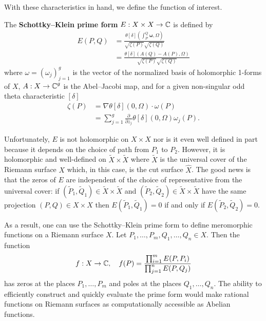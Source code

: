 With these characteristics in hand, we define the function of interest.
\begin{definition}
  The {\bf Schottky--Klein prime form} $E: X \times X \to \operatorname{\mathbb{C}}$ is defined
  by
  \begin{align*}
    E(P,Q)
    &=
    \frac{
      \theta[\delta]
      \left( \int_{P}^{Q}\mathbf{\omega},\Omega \right)
    }
    {
      \sqrt{\zeta(P)}\sqrt{\zeta(Q)}
    } \\
    &=
    \frac{
      \theta[\delta]
      \left( A(Q) - A(P), \Omega \right)
    }
    {
      \sqrt{\zeta(P)}\sqrt{\zeta(Q)}
    }
  \end{align*}
  where $\omega = (\omega_j)_{j=1}^g$ is the vector of the normalized
  basis of holomorphic 1-forms of $X$, $A: X \to \operatorname{\mathbb{C}}^g$ is the
  Abel--Jacobi map, and for a given non-singular odd theta
  characteristic $[\delta]$
  \begin{align*}
    \zeta(P)
    &= \nabla \theta[\delta](0,\Omega) \cdot \omega(P) \\
    &= \sum_{j=1}^g \frac{\partial}{\partial z_j}
    \theta[\delta](0,\Omega) \omega_j(P).
  \end{align*}
\end{definition}

Unfortunately, $E$ is not holomorphic on $X \times X$ nor is it even
well defined in part because it depends on the choice of path from $P_1$
to $P_2$. However, it is holomorphic and well-defined on $\tilde{X}
\times \tilde{X}$ where $\tilde{X}$ is the universal cover of the
Riemann surface $X$ which, in this case, is the cut surface
$\hat{X}$. The good news is that the zeros of $E$ are independent of the
choice of representative from the universal cover: if
$(\tilde{P}_1,\tilde{Q}_1) \in \tilde{X} \times \tilde{X}$ and
$(\tilde{P}_2,\tilde{Q}_2) \in \tilde{X} \times \tilde{X}$ have the same
projection $(P,Q) \in X \times X$ then $E(\tilde{P}_1,\tilde{Q}_1) = 0$
if and only if $E(\tilde{P}_2,\tilde{Q}_2) = 0$.

As a result, one can use the Schottky--Klein prime form to define
meromorphic functions on a Riemann surface $X$. Let
$P_1,\ldots,P_m,Q_1,\ldots,Q_n \in X$. Then the function
\[
    f : X \to \operatorname{\mathbb{C}}, \quad
    f(P) = \frac{\prod_{i=1}^m E(P,P_i)}{\prod_{j=1}^n E(P,Q_j)}
\]
has zeros at the places $P_1,\ldots,P_m$ and poles at the places
$Q_1,\ldots,Q_n$. The ability to efficiently construct and quickly
evaluate the prime form would make rational functions on Riemann
surfaces as computationally accessible as Abelian functions.

